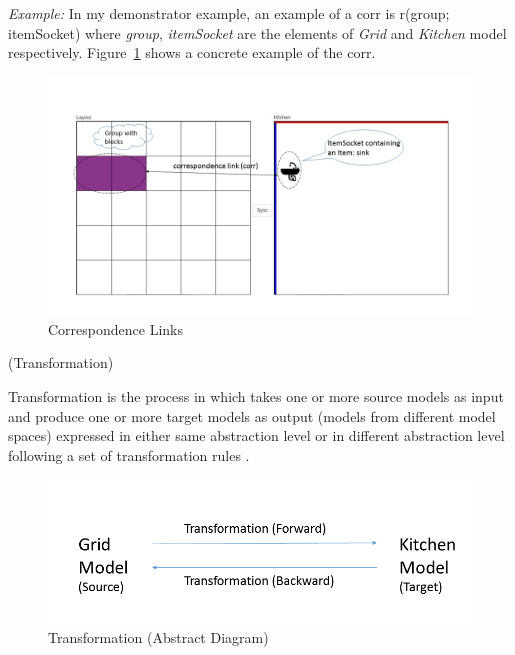 \textit{Example:} In my demonstrator example, an example of a corr is r(group; itemSocket) where \textit{group}, \textit{itemSocket} are the elements of \textit{Grid} and \textit{Kitchen} model respectively. Figure~\ref{fig:Correspondence_Links} shows a concrete example of the corr.\\
\begin{figure}
	\includegraphics[width=1\textwidth]{figures/Corr}
	\caption{Correspondence Links}
	\label{fig:Correspondence_Links}
\end{figure}

\begin{defn}\label{defTransformation } (Transformation) \end{defn}
Transformation is the process in which takes one or more source models as input and produce one or more target models as output (models from different model spaces) expressed in either same abstraction level or in different abstraction level following a set of transformation rules \cite{modeltransform}.\\

\begin{figure}
	\includegraphics[width=1\textwidth]{figures/Transformation_Abstract}
	\caption{Transformation (Abstract Diagram)}
	\label{fig:Transformation_Abstract}
\end{figure}

